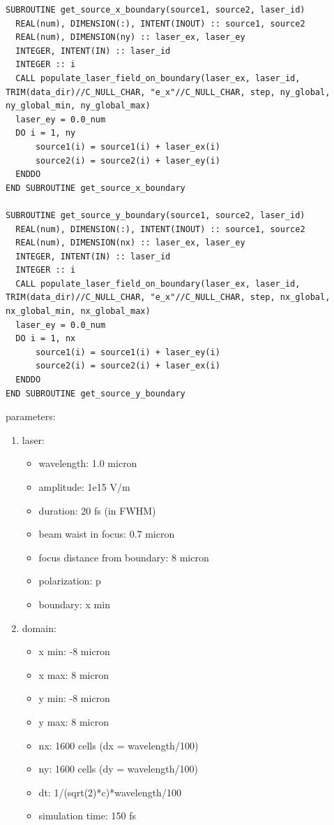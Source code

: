 \begin{lstlisting}[style=FORTRAN, caption=Fortran subroutines for populating laser sources on boundaries]
SUBROUTINE get_source_x_boundary(source1, source2, laser_id) 
  REAL(num), DIMENSION(:), INTENT(INOUT) :: source1, source2
  REAL(num), DIMENSION(ny) :: laser_ex, laser_ey
  INTEGER, INTENT(IN) :: laser_id
  INTEGER :: i
  CALL populate_laser_field_on_boundary(laser_ex, laser_id, TRIM(data_dir)//C_NULL_CHAR, "e_x"//C_NULL_CHAR, step, ny_global, ny_global_min, ny_global_max)
  laser_ey = 0.0_num
  DO i = 1, ny
	  source1(i) = source1(i) + laser_ex(i)
	  source2(i) = source2(i) + laser_ey(i)
  ENDDO
END SUBROUTINE get_source_x_boundary
  
SUBROUTINE get_source_y_boundary(source1, source2, laser_id)
  REAL(num), DIMENSION(:), INTENT(INOUT) :: source1, source2
  REAL(num), DIMENSION(nx) :: laser_ex, laser_ey
  INTEGER, INTENT(IN) :: laser_id
  INTEGER :: i
  CALL populate_laser_field_on_boundary(laser_ex, laser_id, TRIM(data_dir)//C_NULL_CHAR, "e_x"//C_NULL_CHAR, step, nx_global, nx_global_min, nx_global_max)
  laser_ey = 0.0_num
  DO i = 1, nx
	  source1(i) = source1(i) + laser_ey(i)
	  source2(i) = source2(i) + laser_ex(i)
  ENDDO
END SUBROUTINE get_source_y_boundary
\end{lstlisting}


\noindent
parameters:
\begin{enumerate}
	\item laser:
	\begin{itemize}
		\item wavelength: 1.0 micron
		\item amplitude: 1e15 V/m
		\item duration: 20 fs (in FWHM)
		\item beam waist in focus: 0.7 micron
		\item focus distance from boundary: 8 micron
		\item polarization: p
		\item boundary: x min 
	\end{itemize}
	\item domain:
	\begin{itemize}
		\item x min: -8 micron
		\item x max: 8 micron
		\item y min: -8 micron
		\item y max: 8 micron
		\item nx: 1600 cells (dx = wavelength/100)
		\item ny: 1600 cells (dy = wavelength/100)
		\item dt: 1/(sqrt(2)*c)*wavelength/100
		\item simulation time: 150 fs
	\end{itemize}
\end{enumerate}

